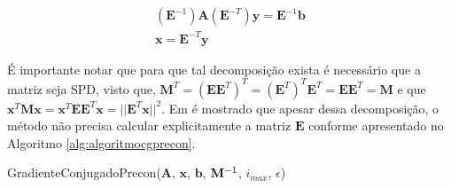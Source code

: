 \begin{align} \label{eq:esqdirpreconcg}
(\mathbf{E}^{-1})\mathbf{A}(\mathbf{E}^{-T}) \mathbf{y} = \mathbf{E}^{-1}\mathbf{b} \\
\mathbf{x} = \mathbf{E}^{-T} \mathbf{y}
\end{align}


É importante notar que para que tal decomposição exista é necessário que a matriz seja SPD, visto que, $\mathbf{M}^T = (\mathbf{E}\mathbf{E}^T)^T = (\mathbf{E}^T)^T \mathbf{E}^T = \mathbf{E}\mathbf{E}^T = \mathbf{M}$ e que $\mathbf{x}^T \mathbf{M} \mathbf{x} = \mathbf{x}^T \mathbf{E}\mathbf{E}^T \mathbf{x} = ||\mathbf{E}^T\mathbf{x}||^2$. Em \citet{Shewchuk94anintroduction} é mostrado que apesar  dessa decomposição, o método não precisa calcular explicitamente a matriz $\mathbf{E}$ conforme apresentado no Algoritmo \ref{alg:algoritmocgprecon}.


\vspace{1cm}
\begin{algorithm}[H]
\caption{GradienteConjugadoPrecon($\mathbf{A}$, $\mathbf{x}$, $\mathbf{b}$, $\mathbf{M}^{-1}$, $i_{max}$, $\epsilon$)}
\label{alg:algoritmocgprecon}
\end{algorithm}
\vspace{1cm}


